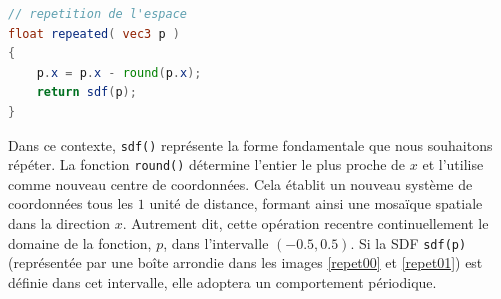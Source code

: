\begin{minipage}{\linewidth}
\begin{lstlisting}[language=GLSL, caption=Répétition de l'espace sur l'axe $X$, captionpos=b,frame=single]
// repetition de l'espace
float repeated( vec3 p )
{
    p.x = p.x - round(p.x);
    return sdf(p);
}
\end{lstlisting}
\end{minipage}

Dans ce contexte, \lstinline{sdf()} représente la forme fondamentale que nous souhaitons répéter. La fonction \mbox{\lstinline{round()}} détermine l'entier le plus proche de $x$ et l'utilise comme nouveau centre de coordonnées. Cela établit un nouveau système de coordonnées tous les $1$ unité de distance, formant ainsi une mosaïque spatiale dans la direction $x$. Autrement dit, cette opération recentre continuellement le domaine de la fonction, $p$, dans l'intervalle $(-0.5, 0.5)$. Si la SDF \lstinline{sdf(p)} (représentée par une boîte arrondie dans les images \ref{repet00} et \ref{repet01}) est définie dans cet intervalle, elle adoptera un comportement périodique.

